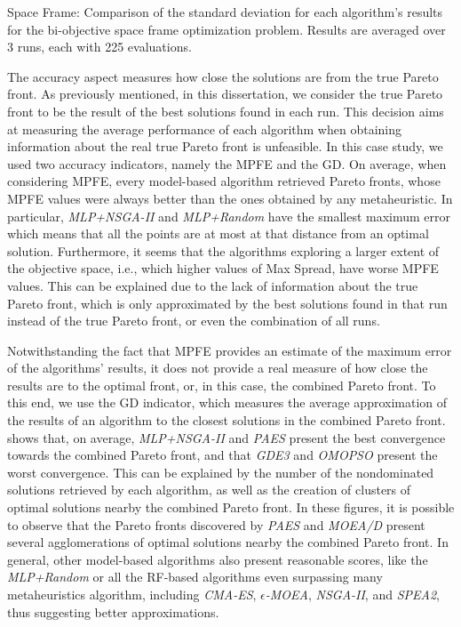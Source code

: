 \begin{table}[htbp]
	\centering
	\caption[Space Frame: Standard deviation values of the algorithms' results]{Space Frame: Comparison of the standard deviation for each algorithm's results for the bi-objective space frame optimization problem. Results are averaged over 3 runs, each with 225 evaluations.}
	\label{table:spaceframestd}
\end{table}

The accuracy aspect measures how close the solutions are from the true Pareto front. As previously mentioned, in this dissertation, we consider the true Pareto front to be the result of the best solutions found in each run. This decision aims at measuring the average performance of each algorithm when obtaining information about the real true Pareto front is unfeasible. In this case study, we used two accuracy indicators, namely the \ac{MPFE} and the \ac{GD}. On average, when considering \ac{MPFE}, every model-based algorithm retrieved Pareto fronts, whose \ac{MPFE} values were always better than the ones obtained by any metaheuristic. In particular, \textit{MLP+NSGA-II} and \textit{MLP+Random} have the smallest maximum error which means that all the points are at most at that distance from an optimal solution. Furthermore, it seems that the algorithms exploring a larger extent of the objective space, i.e., which higher values of Max Spread, have worse \ac{MPFE} values. This can be explained due to the lack of information about the true Pareto front, which is only approximated by the best solutions found in that run instead of the true Pareto front, or even the combination of all runs. 

Notwithstanding the fact that \ac{MPFE} provides an estimate of the maximum error of the algorithms' results, it does not provide a real measure of how close the results are to the optimal front, or, in this case, the combined Pareto front. To this end, we use the \ac{GD} indicator, which measures the average approximation of the results of an algorithm to the closest solutions in the combined Pareto front.  shows that, on average, \textit{MLP+NSGA-II} and \textit{PAES} present the best convergence towards the combined Pareto front, and that \textit{GDE3} and \textit{OMOPSO} present the worst convergence. This can be explained by the number of the nondominated solutions retrieved by each algorithm, as well as the creation of clusters of optimal solutions nearby the combined Pareto front. In these figures, it is possible to observe that the Pareto fronts discovered by \textit{PAES} and \textit{MOEA/D} present several agglomerations of optimal solutions nearby the combined Pareto front. In general, other model-based algorithms also present reasonable scores, like the \textit{MLP+Random} or all the \ac{RF}-based algorithms even surpassing many metaheuristics algorithm, including \textit{CMA-ES}, \textit{$\epsilon$-MOEA}, \textit{\ac{NSGA-II}}, and \textit{\ac{SPEA2}}, thus suggesting better approximations.

